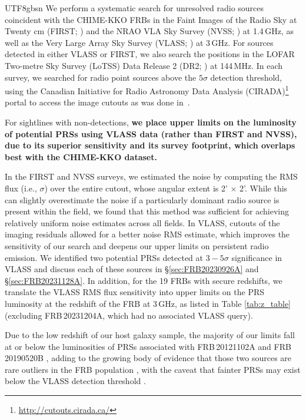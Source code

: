 \documentclass[twocolumn,linenumbers]{aastex631}
\newcommand{\msbold}[1]{\textbf{#1}}
\begin{document}
\begin{CJK*}{UTF8}{gbsn}
We perform a systematic search for unresolved radio sources coincident with the CHIME-KKO FRBs in the Faint Images of the Radio Sky at Twenty cm (FIRST; \citealt{FIRST}) and the NRAO VLA Sky Survey (NVSS; \citealt{NVSS}) at 1.4\,GHz, as well as the Very Large Array Sky Survey (VLASS; \citealt{VLASS}) at 3\,GHz. For sources detected in either VLASS or FIRST, we also search the positions in the LOFAR Two-metre Sky Survey (LoTSS) Data Release 2 (DR2; \citealt{LoTSS}) at 144\,MHz. In each survey, we searched for radio point sources above the $5\sigma$ detection threshold, using the Canadian Initiative for Radio Astronomy Data Analysis (CIRADA)\footnote{\url{http://cutouts.cirada.ca/}} portal to access the image cutouts as was done in~\citet{Ibik2024prs}. 

For sightlines with non-detections, \msbold{we place upper limits on the luminosity of potential PRSs using VLASS data (rather than FIRST and NVSS), due to its superior sensitivity and its survey footprint, which overlaps best with the CHIME-KKO dataset.}

In the FIRST and NVSS surveys, we estimated the noise by computing the RMS flux (i.e., $\sigma$) over the entire cutout, whose angular extent is 2' $\times$ 2'.  While this can slightly overestimate the noise if a particularly dominant radio source is present within the field, we found that this method was sufficient for achieving relatively uniform noise estimates across all fields. In VLASS, cutouts of the imaging residuals allowed for a better noise RMS estimate, which improves the sensitivity of our search and deepens our upper limits on persistent radio emission. We identified two potential PRSs detected at $3-5\sigma$ significance in VLASS and discuss each of these sources in \S\ref{sec:FRB20230926A} and \S\ref{sec:FRB20231128A}. In addition, for the 19 FRBs with secure redshifts, we translate the VLASS RMS flux sensitivity into upper limits on the PRS luminosity at the redshift of the FRB at 3\,GHz, as listed in Table \ref{tab:z_table} (excluding FRB\,20231204A, which had no associated VLASS query). 

Due to the low redshift of our host galaxy sample, the majority of our limits fall at or below the luminosities of PRSs associated with FRB\,20121102A and FRB\,20190520B \citep{chatterjee2017direct, niu2021repeating}, adding to the growing body of evidence that those two sources are rare outliers in the FRB population \citep{Law_2022, law2024deep, sharma2024preferential}, with the caveat that fainter PRSs may exist below the VLASS detection threshold \citep[e.g.,][]{Ibik2024prs}. %


\end{CJK*}
\end{document}
